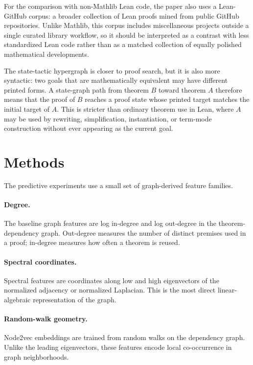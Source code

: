 \documentclass[11pt]{article}
\begin{document}
For the comparison with non-Mathlib Lean code, the paper also uses a
Lean-GitHub corpus: a broader collection of Lean proofs mined from public
GitHub repositories. Unlike Mathlib, this corpus includes miscellaneous
projects outside a single curated library workflow, so it should be interpreted
as a contrast with less standardized Lean code rather than as a matched
collection of equally polished mathematical developments.

The state-tactic hypergraph is closer to proof search, but it is also more
syntactic: two goals that are mathematically equivalent may have different
printed forms. A state-graph path from theorem $B$ toward theorem $A$ therefore
means that the
proof of $B$ reaches a proof state whose printed target matches the initial
target of $A$. This is stricter than ordinary theorem use in Lean, where $A$
may be used by rewriting, simplification, instantiation, or term-mode
construction without ever appearing as the current goal.

\section{Methods}

The predictive experiments use a small set of graph-derived feature families.

\paragraph{Degree.}
The baseline graph features are log in-degree and log out-degree in the
theorem-dependency graph. Out-degree measures the number of distinct premises
used in a proof; in-degree measures how often a theorem is reused.

\paragraph{Spectral coordinates.}
Spectral features are coordinates along low and high eigenvectors of the
normalized adjacency or normalized Laplacian. This is the most direct
linear-algebraic representation of the graph.

\paragraph{Random-walk geometry.}
Node2vec embeddings are trained from random walks on the dependency graph.
Unlike the leading eigenvectors, these features encode local co-occurrence in
graph neighborhoods.
\end{document}
